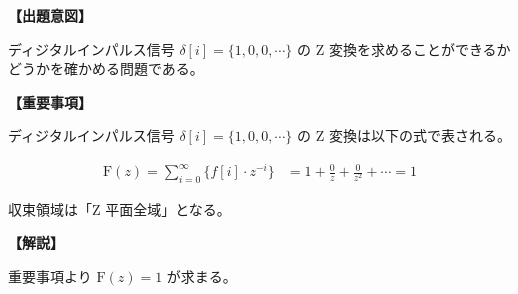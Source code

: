 \noindent \textbf{【出題意図】}

\bigskip
\noindent ディジタルインパルス信号 $\delta[i] = \{1,0,0,\cdots \}$ の Z 変換を求めることができるかどうかを確かめる問題である。

\vspace{1em}
\noindent \textbf{【重要事項】}

\medskip
ディジタルインパルス信号 $\delta[i] = \{1,0,0,\cdots\}$ の Z 変換は以下の式で表される。

\begin{align*}
\textrm{F}(z) = \sum_{i=0}^{\infty} \{ f[i] \cdot z^{-i} \} 
& = 1 + \frac{0}{z} + \frac{0}{z^2} + \cdots
= 1
\end{align*}

\medskip
\noindent 収束領域は「Z 平面全域」となる。

\bigskip

\vspace{1em}
\noindent \textbf{【解説】}

\bigskip
\noindent 重要事項より $\textrm{F}(z) = 1 $ が求まる。
